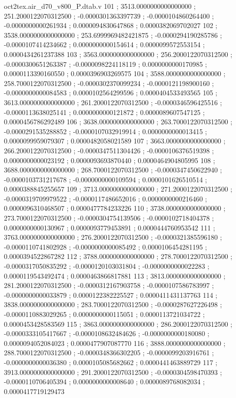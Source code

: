 \begin{filecontents}[overwrite]{oct2tex.air_d70_v800_P.dtab.v}
101 ; 3513.0000000000000000 ; 251.2000122070312500 ; -0.0000301363397739 ; -0.0000104860264400 ; -0.0000000000261934 ; 0.0000094830647868 ; 0.0000382069702027
102 ; 3538.0000000000000000 ; 253.6999969482421875 ; -0.0000294190285786 ; -0.0000107414234662 ; 0.0000000000154614 ; 0.0000099572553154 ; 0.0000434261237388
103 ; 3563.0000000000000000 ; 256.2000122070312500 ; -0.0000300651263387 ; -0.0000098224118119 ; 0.0000000000170985 ; 0.0000113390160550 ; 0.0000396903269575
104 ; 3588.0000000000000000 ; 258.7000122070312500 ; -0.0000302370099234 ; -0.0000121198900160 ; -0.0000000000084583 ; 0.0000102564299596 ; 0.0000404533493565
105 ; 3613.0000000000000000 ; 261.2000122070312500 ; -0.0000346596425516 ; -0.0000113638025141 ; 0.0000000000121872 ; 0.0000089607547125 ; 0.0000456786292489
106 ; 3638.0000000000000000 ; 263.7000122070312500 ; -0.0000291535288852 ; -0.0000107032919914 ; 0.0000000000013415 ; 0.0000099959079307 ; 0.0000482058021589
107 ; 3663.0000000000000000 ; 266.2000122070312500 ; -0.0000347511304426 ; -0.0000106376519398 ; 0.0000000000023192 ; 0.0000093693870440 ; 0.0000464904805995
108 ; 3688.0000000000000000 ; 268.7000122070312500 ; -0.0000347450622940 ; -0.0000103731217678 ; -0.0000000000109594 ; 0.0000101626510514 ; 0.0000388845255657
109 ; 3713.0000000000000000 ; 271.2000122070312500 ; -0.0000319709979522 ; -0.0000117486652016 ; 0.0000000000216460 ; 0.0000096310468507 ; 0.0000477784233226
110 ; 3738.0000000000000000 ; 273.7000122070312500 ; -0.0000304754139506 ; -0.0000102718404378 ; 0.0000000000130967 ; 0.0000093779453891 ; 0.0000444760953542
111 ; 3763.0000000000000000 ; 276.2000122070312500 ; -0.0000321385596180 ; -0.0000110741802928 ; -0.0000000000085492 ; 0.0000106454281195 ; 0.0000394522867282
112 ; 3788.0000000000000000 ; 278.7000122070312500 ; -0.0000317050835292 ; -0.0000120103031804 ; -0.0000000000022283 ; 0.0000119543492474 ; 0.0000463866817881
113 ; 3813.0000000000000000 ; 281.2000122070312500 ; -0.0000312167903758 ; -0.0000107586783997 ; -0.0000000000033879 ; 0.0000122382225527 ; 0.0000411431137763
114 ; 3838.0000000000000000 ; 283.7000122070312500 ; -0.0000287627226498 ; -0.0000110883029265 ; 0.0000000000115051 ; 0.0000113721034722 ; 0.0000453428583569
115 ; 3863.0000000000000000 ; 286.2000122070312500 ; -0.0000333105417667 ; -0.0000108632484626 ; -0.0000000000180080 ; 0.0000094052084023 ; 0.0000477907087770
116 ; 3888.0000000000000000 ; 288.7000122070312500 ; -0.0000348366302205 ; -0.0000099203916761 ; -0.0000000000036380 ; 0.0000105085682662 ; 0.0000441463889729
117 ; 3913.0000000000000000 ; 291.2000122070312500 ; -0.0000304598470393 ; -0.0000110706405394 ; 0.0000000000008640 ; 0.0000089768082034 ; 0.0000417719129473

\end{filecontents}
